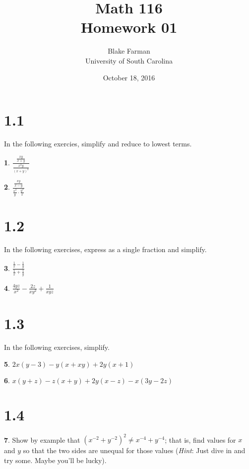 \documentclass[12pt]{book}
\author{Blake Farman\\University of South Carolina}
\title{Math 116\\Homework 01}
\date{October 18, 2016}
\theoremstyle{definition}
\newtheorem{thm}{}
\begin{document}
\maketitle

\section*{1.1}
In the following exercies, simplify and reduce to lowest terms.
\setcounter{thm}{12}
\begin{thm}
  $\displaystyle{\frac{\frac{xy}{x + y}}{\frac{x^2y}{(x + y)^3}}}$
\end{thm}

\begin{thm}
$\displaystyle{\frac{\frac{xy}{x - y}}{\frac{x^2}{y} \cdot \frac{y^3}{x}}}$
\end{thm}

\section*{1.2}
In the following exercises, express as a single fraction and simplify.
\setcounter{thm}{15}
\begin{thm}
  $\displaystyle{\frac{\frac{1}{x} - \frac{1}{y}}{\frac{1}{x} + \frac{1}{y}}}$
\end{thm}

\setcounter{thm}{20}
\begin{thm}
  $\displaystyle{\frac{4yz}{x^2} - \frac{2z}{xy^2} + \frac{1}{xyz}}$
\end{thm}

\section*{1.3}
In the following exercises, simplify.
\setcounter{thm}{6}
\begin{thm}
  $\displaystyle{2x(y - 3) - y(x + xy) + 2y(x + 1)}$
\end{thm}

\setcounter{thm}{7}
\begin{thm}
  $\displaystyle{x(y + z) - z(x + y) + 2y(x - z) - x(3y - 2z)}$
\end{thm}

\section*{1.4}

\setcounter{thm}{9}

\begin{thm}
  Show by example that $(x^{-2} + y^{-2})^2 \neq x^{-4} + y^{-4}$; that is, find values for $x$ and $y$ so that the two sides are unequal for those values ({\it Hint}: Just dive in and try some.  Maybe you'll be lucky).
\end{thm}
\end{document}
